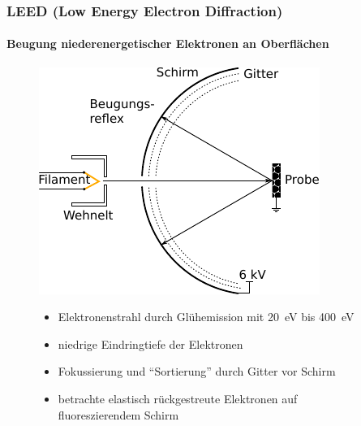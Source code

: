 \documentclass{beamer}
\begin{document}
\begin{frame}
\frametitle{LEED (Low Energy Electron Diffraction)}
\framesubtitle{Beugung niederenergetischer Elektronen an Oberflächen}
\begin{figure}[htbp]
	\begin{minipage}[b]{0.45\textwidth}
		\includegraphics[]{bilder/leedkleiner}
	\end{minipage}
	\hspace{0.4cm}
	\begin{minipage}[b]{0.45\textwidth}
		\begin{itemize}
 		\item Elektronenstrahl durch Glühemission mit \SI{20}{eV} bis \SI{400}{eV}
 	 	\item niedrige Eindringtiefe der Elektronen
 	 	\item Fokussierung und "`Sortierung"' durch Gitter vor Schirm
 	 	\item betrachte elastisch rückgestreute Elektronen auf fluoreszierendem Schirm
		\end{itemize}
	\end{minipage}
\end{figure}
\end{frame}
\end{document}
